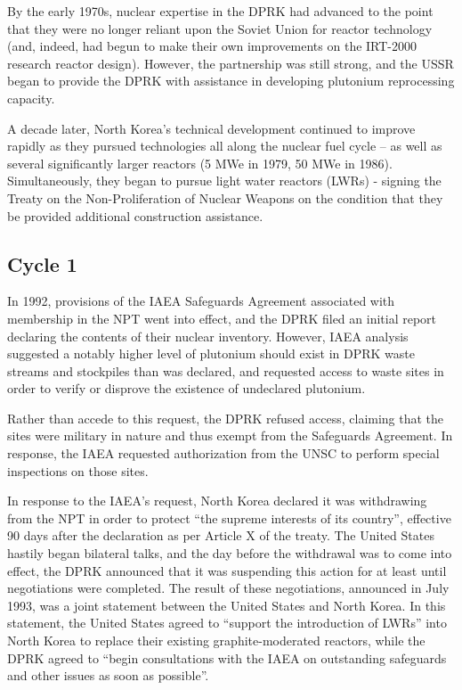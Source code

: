 \documentclass{article}
\begin{document}
By the early 1970s, nuclear expertise in the DPRK had advanced to the point that they were no longer reliant upon the Soviet Union for reactor technology (and, indeed, had begun to make their own improvements on the IRT-2000 research reactor design)\cite{nti15}. However, the partnership was still strong, and the USSR began to provide the DPRK with assistance in developing plutonium reprocessing capacity\cite{nti15}.

A decade later, North Korea’s technical development continued to improve rapidly as they pursued technologies all along the nuclear fuel cycle – as well as several significantly larger reactors (5 MWe in 1979\cite{ntiYongbyon}, 50 MWe in 1986\cite{ntiYongbyon2}). Simultaneously, they began to pursue light water reactors (LWRs) - signing the Treaty on the Non-Proliferation of Nuclear Weapons on the condition that they be provided additional construction assistance\cite{nti15}.   

\subsection{Cycle 1}

In 1992, provisions of the IAEA Safeguards Agreement associated with membership in the NPT went into effect, and the DPRK filed an initial report declaring the contents of their nuclear inventory\cite{iaea92}. However, IAEA analysis suggested a notably higher level of plutonium should exist in DPRK waste streams and stockpiles than was declared, and requested access to waste sites in order to verify or disprove the existence of undeclared plutonium\cite{iaea09}. 

Rather than accede to this request, the DPRK refused access, claiming that the sites were military in nature and thus exempt from the Safeguards Agreement\cite{nti15,iaea09}. In response, the IAEA requested authorization from the UNSC to perform special inspections on those sites\cite{nti15}.
 
In response to the IAEA’s request, North Korea declared it was withdrawing from the NPT in order to protect “the supreme interests of its country”, effective 90 days after the declaration as per Article X of the treaty\cite{npt}. The United States hastily began bilateral talks, and the day before the withdrawal was to come into effect, the DPRK announced that it was suspending this action for at least until negotiations were completed\cite{nti15}. The result of these negotiations, announced in July 1993, was a joint statement between the United States and North Korea. In this statement, the United States agreed to “support the introduction of LWRs” into North Korea to replace their existing graphite-moderated reactors, while the DPRK agreed to “begin consultations with the IAEA on outstanding safeguards and other issues as soon as possible”\cite{hayes}. 
\end{document}
